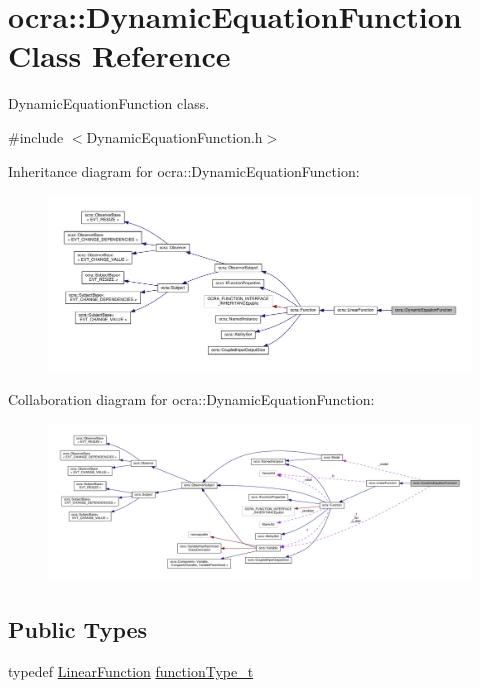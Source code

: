\hypertarget{classocra_1_1DynamicEquationFunction}{}\section{ocra\+:\+:Dynamic\+Equation\+Function Class Reference}
\label{classocra_1_1DynamicEquationFunction}


Dynamic\+Equation\+Function class.  




{\ttfamily \#include $<$Dynamic\+Equation\+Function.\+h$>$}



Inheritance diagram for ocra\+:\+:Dynamic\+Equation\+Function\+:
\nopagebreak
\begin{figure}[H]
\begin{center}
\leavevmode
\includegraphics[width=350pt]{d2/d9b/classocra_1_1DynamicEquationFunction__inherit__graph}
\end{center}
\end{figure}


Collaboration diagram for ocra\+:\+:Dynamic\+Equation\+Function\+:
\nopagebreak
\begin{figure}[H]
\begin{center}
\leavevmode
\includegraphics[width=350pt]{df/dbf/classocra_1_1DynamicEquationFunction__coll__graph}
\end{center}
\end{figure}
\subsection*{Public Types}
\begin{DoxyCompactItemize}
\item 
typedef \hyperlink{classocra_1_1LinearFunction}{Linear\+Function} \hyperlink{classocra_1_1DynamicEquationFunction_a2c8c76bfd66285d63895ec34219175b4}{function\+Type\+\_\+t}
\end{DoxyCompactItemize}
